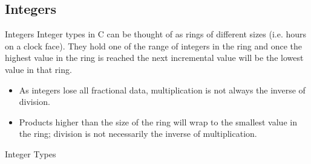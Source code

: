 \documentclass[smaller,handout,table]{beamer}
\begin{document}
\subsection{Integers}
\begin{frame}{Integers}
Integer types in C can be thought of as rings of different sizes (i.e. hours on a clock face). They hold one of the range of integers in the ring and once the highest value in the ring is reached the next incremental value will be the lowest value in that ring.
\begin{itemize}
\item As integers lose all fractional data, multiplication is not always the inverse of division.
\item Products higher than the size of the ring will wrap to the smallest value in the ring; division is not necessarily the inverse of multiplication.
\end{itemize}

\begin{block}{Integer Types}
\end{block}
\end{frame}
\end{document}

